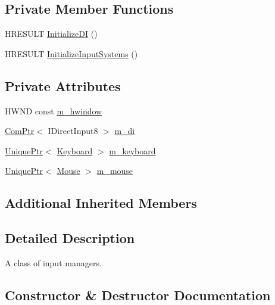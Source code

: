 \subsection*{Private Member Functions}
\begin{DoxyCompactItemize}
\item 
H\+R\+E\+S\+U\+LT \hyperlink{classmage_1_1_input_manager_af3ca0717e37916463cc4f40c7d174b33}{Initialize\+DI} ()
\item 
H\+R\+E\+S\+U\+LT \hyperlink{classmage_1_1_input_manager_a34f114c4c667a4a14ce8236b35d308d8}{Initialize\+Input\+Systems} ()
\end{DoxyCompactItemize}
\subsection*{Private Attributes}
\begin{DoxyCompactItemize}
\item 
H\+W\+ND const \hyperlink{classmage_1_1_input_manager_add8e8743b27a9c94caa1d793b31b0638}{m\+\_\+hwindow}
\item 
\hyperlink{namespacemage_ae74f374780900893caa5555d1031fd79}{Com\+Ptr}$<$ I\+Direct\+Input8 $>$ \hyperlink{classmage_1_1_input_manager_a0ffbd0e68b5bab33c35f310625884f3a}{m\+\_\+di}
\item 
\hyperlink{namespacemage_a8c307fbcc33bce9b7f2aa4c26c3b95cf}{Unique\+Ptr}$<$ \hyperlink{classmage_1_1_keyboard}{Keyboard} $>$ \hyperlink{classmage_1_1_input_manager_a196bdd04e169e89d0fa5f6a4a180e4cb}{m\+\_\+keyboard}
\item 
\hyperlink{namespacemage_a8c307fbcc33bce9b7f2aa4c26c3b95cf}{Unique\+Ptr}$<$ \hyperlink{classmage_1_1_mouse}{Mouse} $>$ \hyperlink{classmage_1_1_input_manager_aab9773cccf9626a7e2acb99227b42e37}{m\+\_\+mouse}
\end{DoxyCompactItemize}
\subsection*{Additional Inherited Members}


\subsection{Detailed Description}
A class of input managers. 

\subsection{Constructor \& Destructor Documentation}
\hypertarget{classmage_1_1_input_manager_afc28df27a0251c242113a9761c007534}{}\label{classmage_1_1_input_manager_afc28df27a0251c242113a9761c007534} 
